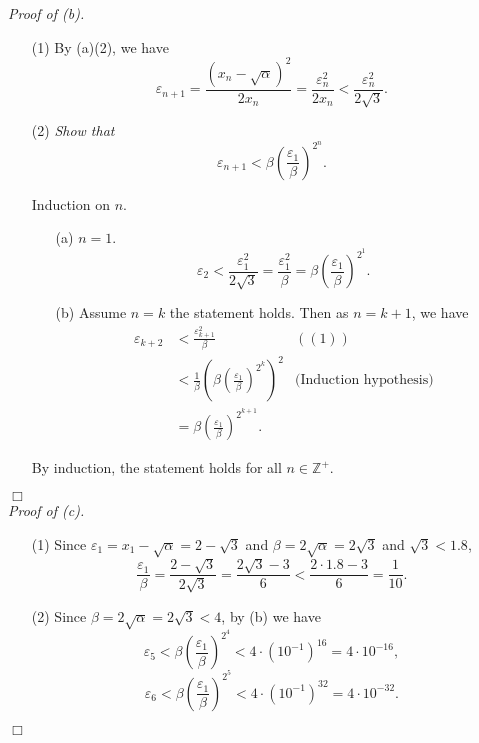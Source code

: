 \documentclass{article}
\begin{document}
\emph{Proof of (b).}
\begin{enumerate}
\item[(1)]
  By (a)(2), we have
  $$\varepsilon_{n+1}
  = \frac{(x_n - \sqrt{\alpha})^2}{2 x_n}
  = \frac{\varepsilon_n^2}{2 x_n}
  < \frac{\varepsilon_n^2}{2 \sqrt{3}}.$$
\item[(2)]
\emph{Show that
$$\varepsilon_{n+1}
< \beta \left( \frac{\varepsilon_1}{\beta} \right)^{2^n}.$$}

Induction on $n$.
  \begin{enumerate}
  \item[(a)]
  $n = 1$.
  $$\varepsilon_2
  < \frac{\varepsilon_1^2}{2 \sqrt{3}}
  = \frac{\varepsilon_1^2}{\beta}
  = \beta \left( \frac{\varepsilon_1}{\beta} \right)^{2^1}.$$
  \item[(b)]
  Assume $n=k$ the statement holds.
  Then as $n=k+1$, we have
  \begin{align*}
    \varepsilon_{k+2}
    &< \frac{\varepsilon_{k+1}^2}{\beta}
      &((1)) \\
    &< \frac{1}{\beta} \left( \beta \left( \frac{\varepsilon_1}{\beta} \right)^{2^k} \right)^2
      &\text{(Induction hypothesis)}\\
    &= \beta \left( \frac{\varepsilon_1}{\beta} \right)^{2^{k+1}}.
  \end{align*}
  \end{enumerate}
  By induction, the statement holds for all $n \in \mathbb{Z}^+$.
\end{enumerate}
$\Box$ \\



\emph{Proof of (c).}
\begin{enumerate}
\item[(1)]
  Since $\varepsilon_1 = x_1 - \sqrt{\alpha} = 2 - \sqrt{3}$ and
  $\beta = 2 \sqrt{\alpha} = 2 \sqrt{3}$ and $\sqrt{3} < 1.8$,
  $$\frac{\varepsilon_1}{\beta}
  = \frac{2 - \sqrt{3}}{2 \sqrt{3}}
  = \frac{2\sqrt{3} - 3}{6}
  < \frac{2\cdot 1.8 - 3}{6}
  = \frac{1}{10}.$$
\item[(2)]
  Since $\beta = 2 \sqrt{\alpha} = 2 \sqrt{3} < 4$,
  by (b) we have
  $$\varepsilon_5
  < \beta \left( \frac{\varepsilon_1}{\beta} \right)^{2^4}
  < 4 \cdot (10^{-1})^{16}
  = 4 \cdot 10^{-16},$$
  $$\varepsilon_6
  < \beta \left( \frac{\varepsilon_1}{\beta} \right)^{2^5}
  < 4 \cdot (10^{-1})^{32}
  = 4 \cdot 10^{-32}.$$
\end{enumerate}
$\Box$ \\\\
\end{document}
